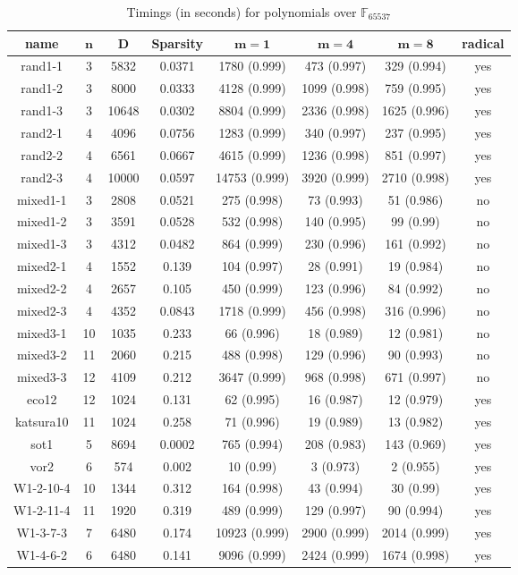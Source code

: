 \documentclass[12pt]{article}
\def\F {\ensuremath{\mathbb{F}}}
\begin{document}
\begin{table}[H]
 \def\arraystretch{1.2}
\setlength\tabcolsep{6pt}
	\caption{Timings (in seconds) for polynomials over $\F_{65537}$}
\begin{center}
	\begin{tabular}{c|c|c|c|c|c|c|c}
		\textbf{name}& $\bm{n}$ & $\bm{D}$ & \textbf{Sparsity} & $\bm{m = 1}$ & $\bm{m = 4}$ & $\bm{m = 8}$ & radical \\
		\hline
		rand1-1&3 &5832&0.0371&1780 (0.999)&473 (0.997)&329 (0.994)&yes\\
		rand1-2&3 &8000&0.0333&4128 (0.999)&1099 (0.998)&759 (0.995)&yes\\
		rand1-3&3 &10648&0.0302&8804 (0.999)&2336 (0.998)&1625 (0.996)&yes\\
		rand2-1&4 &4096&0.0756&1283 (0.999)&340 (0.997)&237 (0.995)&yes\\
		rand2-2&4 &6561&0.0667&4615 (0.999)&1236 (0.998)&851 (0.997)&yes\\
		rand2-3&4 &10000&0.0597&14753 (0.999)&3920 (0.999)&2710 (0.998)&yes\\
		mixed1-1&3 &2808&0.0521&275 (0.998)&73 (0.993)&51 (0.986)&no\\
		mixed1-2&3 &3591&0.0528&532 (0.998)&140 (0.995)&99 (0.99)&no\\
		mixed1-3&3 &4312&0.0482&864 (0.999)&230 (0.996)&161 (0.992)&no\\
		mixed2-1&4 &1552&0.139&104 (0.997)&28 (0.991)&19 (0.984)&no\\
		mixed2-2&4 &2657&0.105&450 (0.999)&123 (0.996)&84 (0.992)&no\\
		mixed2-3&4 &4352&0.0843&1718 (0.999)&456 (0.998)&316 (0.996)&no\\
		mixed3-1&10 &1035&0.233&66 (0.996)&18 (0.989)&12 (0.981)&no\\
		mixed3-2&11 &2060&0.215&488 (0.998)&129 (0.996)&90 (0.993)&no\\
		mixed3-3&12 &4109&0.212&3647 (0.999)&968 (0.998)&671 (0.997)&no\\
		eco12&12 &1024&0.131&62 (0.995)&16 (0.987)&12 (0.979)&yes\\
		katsura10&11 &1024&0.258&71 (0.996)&19 (0.989)&13 (0.982)&yes\\
		sot1&5 &8694&0.0002&765 (0.994)&208 (0.983)&143 (0.969)&yes\\
		vor2&6 &574&0.002&10 (0.99)&3 (0.973)&2 (0.955)&yes\\
		W1-2-10-4&10 &1344&0.312&164 (0.998)&43 (0.994)&30 (0.99)&yes\\
		W1-2-11-4&11 &1920&0.319&489 (0.999)&129 (0.997)&90 (0.994)&yes\\
		W1-3-7-3&7 &6480&0.174&10923 (0.999)&2900 (0.999)&2014 (0.999)&yes\\
		W1-4-6-2&6 &6480&0.141&9096 (0.999)&2424 (0.999)&1674 (0.998)&yes
	\end{tabular}
\end{center}
\end{table}
\end{document}
